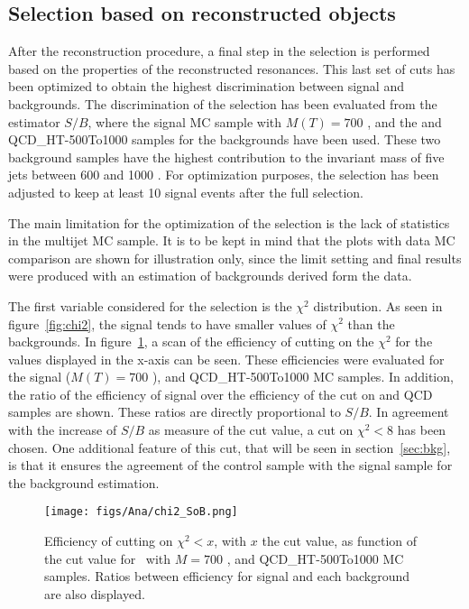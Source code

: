 \subsection{Selection based on reconstructed objects}
\label{sec:finalsel}

After the reconstruction procedure, a final step in the selection is performed based on the properties of the reconstructed resonances. This last set of cuts has been optimized to obtain the highest discrimination between signal and backgrounds. The discrimination of the selection has been evaluated from the estimator $S/B$, where the signal MC sample with $M(T)=700$ \GeVcc, and the \ttbar and QCD\_HT-500To1000 samples for the backgrounds have been used. These two background samples have the highest contribution to the invariant mass of five jets between 600 and 1000 \GeVcc. For optimization purposes, the selection has been adjusted to keep at least 10 signal events after the full selection.

The main limitation for the optimization of the selection is the lack of statistics in the multijet MC sample. It is to be kept in mind that the plots with data MC comparison are shown for illustration only, since the limit setting and final results were produced with an estimation of backgrounds derived form the data.

The first variable considered for the selection is the $\chi^{2}$ distribution. As seen in figure~\ref{fig:chi2}, the signal tends to have smaller values of $\chi^{2}$ than the backgrounds. In figure~\ref{fig:chi2cut}, a scan of the efficiency of cutting on the $\chi^{2}$ for the values displayed in the x-axis can be seen. These efficiencies were evaluated for the signal ($M(T)=700$ \GeVcc), \ttbar and QCD\_HT-500To1000 MC samples. In addition, the ratio of the efficiency of signal over the efficiency of the cut on \ttbar and QCD samples are shown. These ratios are directly proportional to $S/B$. In agreement with the increase of $S/B$ as measure of the cut value, a cut on $\chi^{2}<8$ has been chosen. One additional feature of this cut, that will be seen in section~\ref{sec:bkg}, is that it ensures the agreement of the control sample with the signal sample for the background estimation. 

\begin{figure}[!Hhtbp]
  \begin{center}
    \texttt{[image: figs/Ana/chi2\_SoB.png]}
    \caption{Efficiency of cutting on $\chi^{2}<x$, with $x$ the cut value, as function of the cut value for \Tp~with $M=700$ \GeVcc, \ttbar and QCD\_HT-500To1000 MC samples. Ratios between efficiency for signal and each background are also displayed.}
    \label{fig:chi2cut}
  \end{center}
\end{figure}

